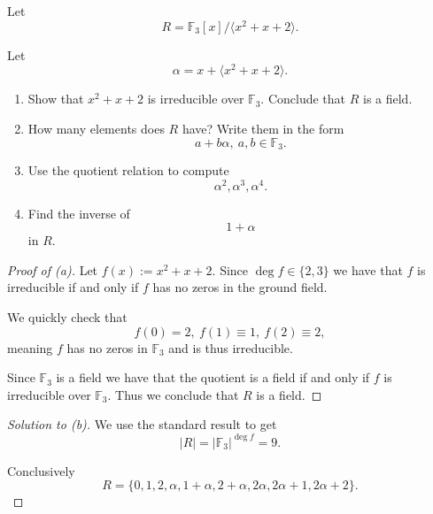 \begin{prob}
    Let 
    \[
        R = \mathbb F_3[x]/\langle x^2 + x + 2 \rangle. 
    \]

    Let 
    \[
        \alpha = x + \langle x^2 + x + 2 \rangle.
    \]

    \begin{enumerate}[label=\alph*)]
        \item Show that 
            $x^2 + x + 2$ is irreducible over 
            $\mathbb F_3$. Conclude that 
            $R$ is a field.

        \item How many elements does $R$ have? 
            Write them in the form 
            \[
                a + b\alpha, \ a,b \in\mathbb F_3. 
            \]
        \item Use the quotient relation to compute 
            \[
                \alpha^2, \alpha^3, \alpha^4. 
            \]

        \item Find the inverse of 
            \[
                1 + \alpha
            \]
            in $R$.
    \end{enumerate}
\end{prob}
\begin{proof}[Proof of (a)]
    Let $f(x) := x^2 + x + 2$. Since $\deg f \in \{2,3\}$ we 
    have that $f$ is irreducible if and only if 
    $f$ has no zeros in the ground field. 

    We quickly check that 
    \[
        f(0) = 2, \ f(1) \equiv 1, \ f(2) \equiv 2,  
    \]
    meaning $f$ has no zeros in $\mathbb F_3$ and is thus 
    irreducible. 

    Since $\mathbb F_3$ is a field we have that 
    the quotient is a field if and only if $f$ is irreducible 
    over $\mathbb F_3$. Thus we conclude that 
    $R$ is a field.
\end{proof}

\begin{proof}[Solution to (b)]
    We use the standard result to get 
    \[
        |R| = |\mathbb F_3|^{\deg f} = 9.
    \]

    Conclusively 
    \[
        R = \{0,1,2, \alpha, 1 + \alpha, 2 + \alpha, 
        2\alpha, 2\alpha + 1, 2\alpha + 2\}.
    \]
\end{proof}

